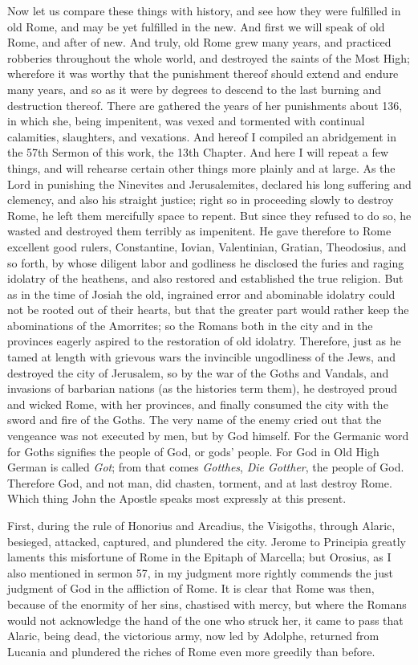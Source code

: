 Now let us compare these things with history, and see how they were fulfilled in old Rome, and may be yet fulfilled in the new. And first we will speak of old Rome, and after of new. And truly, old Rome grew many years, and practiced robberies throughout the whole world, and destroyed the saints of the Most High; wherefore it was worthy that the punishment thereof should extend and endure many years, and so as it were by degrees to descend to the last burning and destruction thereof. There are gathered the years of her punishments about 136, in which she, being impenitent, was vexed and tormented with continual calamities, slaughters, and vexations. And hereof I compiled an abridgement in the 57th Sermon of this work, the 13th Chapter. And here I will repeat a few things, and will rehearse certain other things more plainly and at large. As the Lord in punishing the Ninevites and Jerusalemites, declared his long suffering and clemency, and also his straight justice; right so in proceeding slowly to destroy Rome, he left them mercifully space to repent. But since they refused to do so, he wasted and destroyed them terribly as impenitent. He gave therefore to Rome excellent good rulers, Constantine, Iovian, Valentinian, Gratian, Theodosius, and so forth, by whose diligent labor and godliness he disclosed the furies and raging idolatry of the heathens, and also restored and established the true religion. But as in the time of Josiah the old, ingrained error and abominable idolatry could not be rooted out of their hearts, but that the greater part would rather keep the abominations of the Amorrites; so the Romans both in the city and in the provinces eagerly aspired to the restoration of old idolatry. Therefore, just as he tamed at length with grievous wars the invincible ungodliness of the Jews, and destroyed the city of Jerusalem, so by the war of the Goths and Vandals, and invasions of barbarian nations (as the histories term them), he destroyed proud and wicked Rome, with her provinces, and finally consumed the city with the sword and fire of the Goths. The very name of the enemy cried out that the vengeance was not executed by men, but by God himself. For the Germanic word for Goths signifies the people of God, or gods’ people. For God in Old High German is called \textit{Got}; from that comes \textit{Gotthes}, \textit{Die Gotther}, the people of God. Therefore God, and not man, did chasten, torment, and at last destroy Rome. Which thing John the Apostle speaks most expressly at this present.

First, during the rule of Honorius and Arcadius, the Visigoths, through Alaric, besieged, attacked, captured, and plundered the city. Jerome to Principia greatly laments this misfortune of Rome in the Epitaph of Marcella; but Orosius, as I also mentioned in sermon 57, in my judgment more rightly commends the just judgment of God in the affliction of Rome. It is clear that Rome was then, because of the enormity of her sins, chastised with mercy, but where the Romans would not acknowledge the hand of the one who struck her, it came to pass that Alaric, being dead, the victorious army, now led by Adolphe, returned from Lucania and plundered the riches of Rome even more greedily than before.

